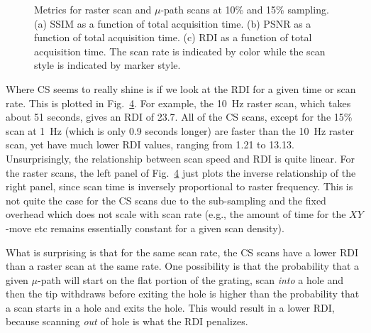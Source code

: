 \documentclass[twocolumn,oneside]{IEEEtran/IEEEtran}
\begin{document}
\begin{figure}[ht!]
  \centering
  \begin{subfigure}{1\textwidth}
    \centering
    
    \caption{}
    \label{fig:time_ssim}
  \end{subfigure}
  \begin{subfigure}{1\textwidth}
    \centering
    
    \caption{}
    \label{fig:time_psnr}
  \end{subfigure}
  \begin{subfigure}{1\textwidth}
    \centering
    
    \caption{}
    \label{fig:time_damage}
  \end{subfigure}
\caption{Metrics for raster scan and $\mu$-path scans at 10\% and 15\% sampling. (a) SSIM as a function of total acquisition time. (b) PSNR  as a function of total acquisition time. (c) RDI as a function of total acquisition time. The scan rate is indicated by color while the scan style is indicated by marker style.}
    
\end{figure}

Where CS seems to really shine is if we look at the RDI for a given time or scan
rate. This is plotted in Fig.~\ref{fig:time_damage}. For example, the 10~Hz
raster scan, which takes about 51 seconds, gives an RDI of 23.7. All of the CS
scans, except for the 15\% scan at 1~Hz (which is only 0.9 seconds longer) are
faster than the 10~Hz raster scan, yet have much lower RDI values, ranging from
1.21 to 13.13. Unsurprisingly, the relationship between scan speed and RDI is
quite linear. For the raster scans, the left panel of Fig.~\ref{fig:time_damage}
just plots the inverse relationship of the right panel, since scan time is
inversely proportional to raster frequency. This is not quite the case for the
CS scans due to the sub-sampling and the fixed overhead which does not scale
with scan rate (e.g., the amount of time for the $XY$-move etc remains
essentially constant for a given scan density).

What is surprising is that for the same scan rate, the CS scans have a lower RDI
than a raster scan at the same rate. One possibility is that the probability
that a given $\mu$-path will start on the flat portion of the grating, scan
\textit{into} a hole and then the tip withdraws before exiting the hole is
higher than the probability that a scan starts in a hole and exits the hole.
This would result in a lower RDI, because scanning \textit{out} of hole is what
the RDI penalizes.
\end{document}
